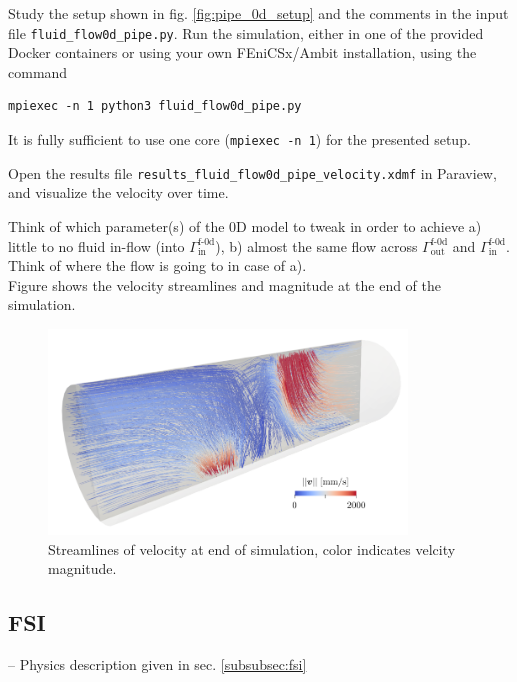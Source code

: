 \documentclass[a4paper,12pt]{report}
\begin{document}
Study the setup shown in fig. \ref{fig:pipe_0d_setup} and the comments in the input file \verb"fluid_flow0d_pipe.py". Run the simulation, either in one of the provided Docker containers or using your own FEniCSx/Ambit installation, using the command
\begin{verbatim}
mpiexec -n 1 python3 fluid_flow0d_pipe.py
\end{verbatim}
It is fully sufficient to use one core (\verb"mpiexec -n 1") for the presented setup.

Open the results file \verb"results_fluid_flow0d_pipe_velocity.xdmf" in Paraview, and visualize the velocity over time.

Think of which parameter(s) of the 0D model to tweak in order to achieve a) little to no fluid in-flow (into $\mathit{\Gamma}_{\mathrm{in}}^{\mathrm{f\text{-}0d}}$), b) almost the same flow across $\mathit{\Gamma}_{\mathrm{out}}^{\mathrm{f\text{-}0d}}$ and $\mathit{\Gamma}_{\mathrm{in}}^{\mathrm{f\text{-}0d}}$. Think of where the flow is going to in case of a).\\

Figure shows the velocity streamlines and magnitude at the end of the simulation.

\begin{figure}
\centering
\includegraphics[width=0.85\textwidth]{fig/pipe_0d_results.png}
\caption{Streamlines of velocity at end of simulation, color indicates velcity magnitude.}
\label{fig:pipe_0d_results}
\end{figure}


\subsection{FSI}\label{subsec:demos:fsi}

-- Physics description given in sec. \ref{subsubsec:fsi}\\
\end{document}
